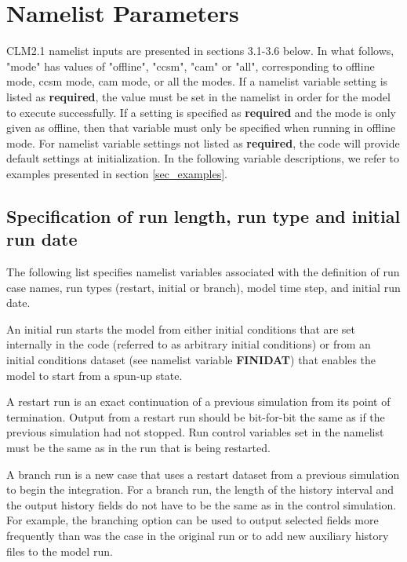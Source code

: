 \section{Namelist Parameters}
\label{sec_namelist}

CLM2.1 namelist inputs are presented in sections 3.1-3.6 below.
In what follows, "mode" has values of "offline", "ccsm", "cam" or "all",
corresponding to offline mode, ccsm mode, cam mode, or all the modes.
If a namelist variable setting is listed as {\bf required}, the
value must be set in the namelist in order for the model to execute
successfully.  If a setting is specified as {\bf required} and the
mode is only given as offline, then that variable must only be
specified when running in offline mode.  For namelist variable
settings not listed as {\bf required}, the code will provide default
settings at initialization.  In the following variable descriptions,
we refer to examples presented in section \ref{sec_examples}.

\subsection {Specification of run length, run type and initial run date}

The following list specifies namelist variables associated with the
definition of run case names, run types (restart, initial or branch),
model time step, and initial run date. 

An initial run starts the model from either initial conditions that
are set internally in the code (referred to as arbitrary initial
conditions) or from an initial conditions dataset (see namelist
variable {\bf FINIDAT}) that enables the model to start from a spun-up
state. 

A restart run is an exact continuation of a previous simulation from
its point of termination.  Output from a restart run should be
bit-for-bit the same as if the previous simulation had not
stopped. Run control variables set in the namelist must be the same as
in the run that is being restarted. 

A branch run is a new case that uses a restart dataset from a previous
simulation to begin the integration. For a branch run, the length of
the history interval and the output history fields do not have to be
the same as in the control simulation. For example, the branching
option can be used to output selected fields more frequently than was
the case in the original run or to add new auxiliary history files to
the model run.

